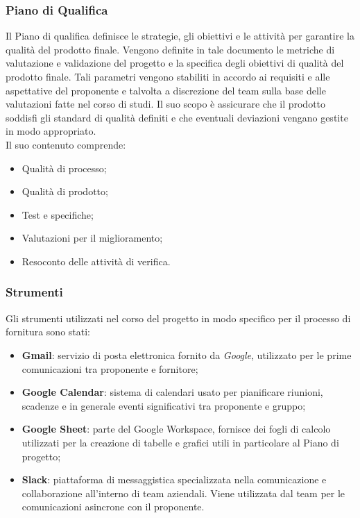 \documentclass[10pt, a4paper]{article}
\begin{document}
\subsubsection{Piano di Qualifica}
Il Piano di qualifica definisce le strategie, gli obiettivi e le attività per garantire la qualità del prodotto finale. Vengono definite in tale documento le metriche di valutazione e validazione del progetto e la specifica degli obiettivi di qualità del prodotto finale. Tali parametri vengono stabiliti in accordo ai requisiti e 
alle aspettative del proponente e talvolta a discrezione del team sulla base delle valutazioni fatte nel corso di studi. Il suo scopo è assicurare che il prodotto soddisfi gli standard di qualità definiti e che eventuali deviazioni vengano gestite in modo appropriato.\\
Il suo contenuto comprende:
\begin{itemize}
    \item Qualità di processo;
    \item Qualità di prodotto;
    \item Test e specifiche;
    \item Valutazioni per il miglioramento;
    \item Resoconto delle attività di verifica.
\end{itemize}
\subsubsection{Strumenti}
Gli strumenti utilizzati nel corso del progetto in modo specifico per il processo di fornitura sono stati:
\begin{itemize}
    \item {\textbf{Gmail}}: servizio di posta elettronica fornito da \textit{Google}, utilizzato per le prime comunicazioni tra proponente e fornitore;
    \item {\textbf{Google Calendar}}: sistema di calendari usato per pianificare riunioni, scadenze e in generale
    eventi significativi tra proponente e gruppo;
    \item {\textbf{Google Sheet}}: parte del Google Workspace, fornisce dei fogli di calcolo utilizzati per la creazione di tabelle e grafici utili in particolare al Piano di progetto;
    \item {\textbf{Slack}}: piattaforma di messaggistica specializzata nella comunicazione e collaborazione all’interno di team aziendali. Viene utilizzata dal team per le comunicazioni asincrone con il proponente.
\end{itemize}
\end{document}
